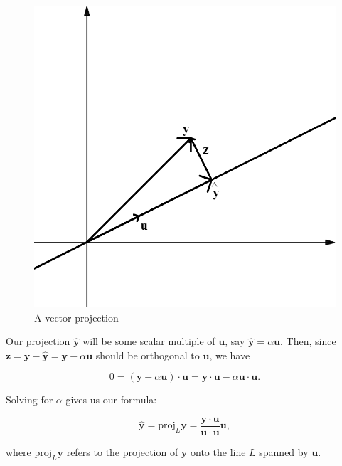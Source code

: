 \documentclass[
]{book}
\theoremstyle{definition}
\theoremstyle{definition}
\theoremstyle{definition}
\theoremstyle{definition}
\theoremstyle{remark}
\begin{document}
\begin{figure}

{\centering \includegraphics[width=0.5\linewidth]{images/vproj1} 

}

\caption{A vector projection}\label{fig:vproj}
\end{figure}

Our projection \(\hat{\mathbf{y}}\) will be some scalar multiple of \(\mathbf{u}\), say \(\hat{\mathbf{y}}=\alpha \mathbf{u}\). Then, since \(\mathbf{z}=\mathbf{y}-\hat{\mathbf{y}}=\mathbf{y}-\alpha\mathbf{u}\) should be orthogonal to \(\mathbf{u}\), we have

\[0=(\mathbf{y}-\alpha\mathbf{u})\cdot\mathbf{u}=\mathbf{y}\cdot\mathbf{u}-\alpha\mathbf{u}\cdot \mathbf{u}.\]

Solving for \(\alpha\) gives us our formula:

\begin{equation}
\hat{\mathbf{y}}=\text{proj}_L\mathbf{y}=\frac{\mathbf{y}\cdot\mathbf{u}}{\mathbf{u}\cdot \mathbf{u}}\mathbf{u},\label{eq:vproj}
\end{equation}

where \(\text{proj}_L\mathbf{y}\) refers to the projection of \(\mathbf{y}\) onto the line \(L\) spanned by \(\mathbf{u}\).
\end{document}

